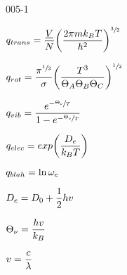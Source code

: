 \begin{mitframe}{005-1} %

    
	\begin{listone}
        
    	\item $\tmpc = \dfrac{\uline{\vol}}{\nummoles}\bigg(\dfrac{2\pie\mass\boltz\Temp}{\planck^{2}}\bigg)^{\sfrac{3}{2}}$
        
    	\item $\rmpc=\dfrac{\pie^{\sfrac{1}{2}}}{\molecrad}\bigg(\dfrac{\Temp^{3}}{\dimltemp_{A}\dimltemp_{B}\dimltemp_{C}}\bigg)^{\sfrac{1}{2}}$
        
    	\item $\vmpc=\dfrac{\e^{-\sfrac{\vibrfreqfac}{\Temp}}}{1-\e^{-\sfrac{\vibrfreqfac}{\Temp}}}$
          
    	\item $\empc=exp\bigg(\dfrac{\eneatom}{\boltz\Temp}\bigg)$   
   
    	\item $q_{blah}=\ln\elecdegen$
        
		\item $\eneatom=\mbde+\dfrac{1}{2}\planck\waven$   
    
    	\item $\vibrfreqfac=\dfrac{\planck\waven}{\boltz}$
    
   		\item $\waven=\dfrac{\lightspeed}{\wavel}$ 
    
    
	\end{listone}			

\end{mitframe}